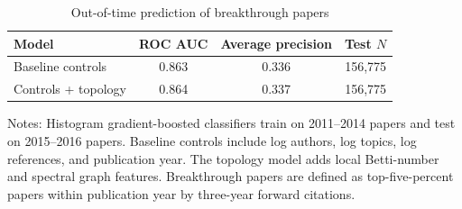 \begin{table}[!htbp]\centering
\begin{threeparttable}
\caption{Out-of-time prediction of breakthrough papers}
\label{tab:prediction}
\begin{tabular}{lccc}
\toprule
Model & ROC AUC & Average precision & Test $N$ \\
\midrule
Baseline controls & 0.863 & 0.336 & 156,775 \\
Controls + topology & 0.864 & 0.337 & 156,775 \\
\bottomrule
\end{tabular}
\begin{tablenotes}
\footnotesize
\item Notes: Histogram gradient-boosted classifiers train on 2011--2014 papers and test on 2015--2016 papers. Baseline controls include log authors, log topics, log references, and publication year. The topology model adds local Betti-number and spectral graph features. Breakthrough papers are defined as top-five-percent papers within publication year by three-year forward citations.
\end{tablenotes}
\end{threeparttable}
\end{table}
